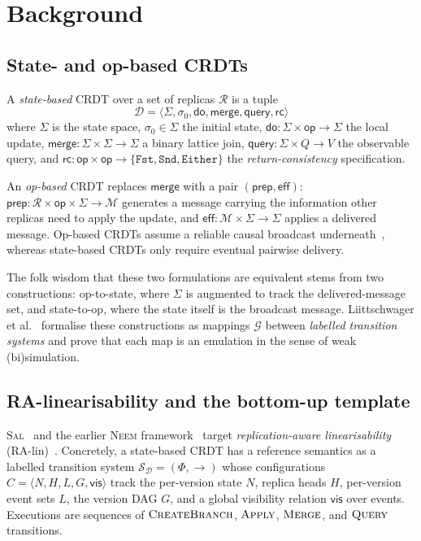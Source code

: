 \documentclass[11pt,a4paper]{article}
\theoremstyle{definition}
\theoremstyle{remark}
\newcommand{\RDT}{\ensuremath{\mathcal{D}}}
\newcommand{\Op}{\mathsf{op}}
\newcommand{\mdo}{\mathsf{do}}
\newcommand{\mmerge}{\mathsf{merge}}
\newcommand{\meff}{\mathsf{eff}}
\newcommand{\mquery}{\mathsf{query}}
\newcommand{\mrc}{\mathsf{rc}}
\newcommand{\mvis}{\mathsf{vis}}
\newcommand{\mprep}{\mathsf{prep}}
\newcommand{\Either}{\mathtt{Either}}
\newcommand{\Fst}{\mathtt{Fst}}
\newcommand{\Snd}{\mathtt{Snd}}
\newcommand{\State}{\Sigma}
\newcommand{\init}{\sigma_0}
\newcommand{\Replica}{\mathcal{R}}
\newcommand{\Msg}{\mathcal{M}}
\newcommand{\Sal}{\textsc{Sal}}
\newcommand{\Emul}{\mathcal{G}}
\begin{document}
\section{Background}
\label{sec:background}

\subsection{State- and op-based CRDTs}

A \emph{state-based} CRDT over a set of replicas $\Replica$ is a
tuple
\[
  \RDT = \langle \State, \init, \mdo, \mmerge, \mquery, \mrc\rangle
\]
where $\State$ is the state space, $\init \in \State$ the initial
state, $\mdo : \State \times \Op \to \State$ the local update,
$\mmerge : \State \times \State \to \State$ a binary lattice join,
$\mquery : \State \times Q \to V$ the observable query, and
$\mrc : \Op \times \Op \to \{\Fst, \Snd, \Either\}$ the
\emph{return-consistency} specification.

An \emph{op-based} CRDT replaces $\mmerge$ with a pair $(\mprep, \meff)$:
$\mprep : \Replica \times \Op \times \State \to \Msg$ generates a
message carrying the information other replicas need to apply the
update, and $\meff : \Msg \times \State \to \State$ applies a
delivered message. Op-based CRDTs assume a reliable causal broadcast
underneath~\cite{lamport-clocks}, whereas state-based CRDTs only
require eventual pairwise delivery.

The folk wisdom that these two formulations are equivalent stems
from two constructions: op-to-state, where $\State$ is augmented to
track the delivered-message set, and state-to-op, where the state
itself is the broadcast message. Liittschwager et
al.~\cite{liittschwager2025} formalise these constructions as
mappings $\Emul$ between \emph{labelled transition systems} and
prove that each map is an emulation in the sense of weak
(bi)simulation.

\subsection{RA-linearisability and the bottom-up template}

\Sal{}~\cite{sal2025} and the earlier \textsc{Neem}
framework~\cite{neem2025} target \emph{replication-aware
linearisability} (RA-lin)~\cite{wang-ra-lin}. Concretely, a
state-based CRDT has a reference semantics as a labelled transition
system $\mathcal{S}_\RDT = (\Phi, \to)$ whose configurations
$C = \langle N, H, L, G, \mvis\rangle$ track the per-version state
$N$, replica heads $H$, per-version event sets $L$, the version DAG
$G$, and a global visibility relation $\mvis$ over events. Executions
are sequences of $\textsc{CreateBranch}$, $\textsc{Apply}$,
$\textsc{Merge}$, and $\textsc{Query}$ transitions.
\end{document}
